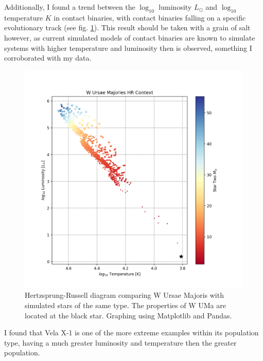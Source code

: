 \documentclass[12pt, a4paper]{article}
\begin{document}
        Additionally, I found a trend between the $\log_{10}$ luminosity $L_{\odot}$ and $\log_{10}$ temperature $K$ in contact binaries, with contact binaries falling on a specific evolutionary track (see fig. \ref{ContactBinaryTrack}). This result should be taken with a grain of salt however, as current simulated models of contact binaries are known to simulate systems with higher temperature and luminosity then is observed, something I corroborated with my data.

        \begin{figure}[H]
            \centering
            \includegraphics[width = .6\textwidth]{figs/GeneratedFigs/W_UMa/WUMaHRDiagram.png}
            \caption{Hertzsprung-Russell diagram comparing W Ursae Majoris with simulated stars of the same type. The properties of W UMa are located at the black star. Graphing using Matplotlib and Pandas.}
            \label{ContactBinaryTrack}
        \end{figure}
        

        I found that Vela X-1 is one of the more extreme examples within its population type, having a much greater luminosity and temperature then the greater population.
\end{document}
